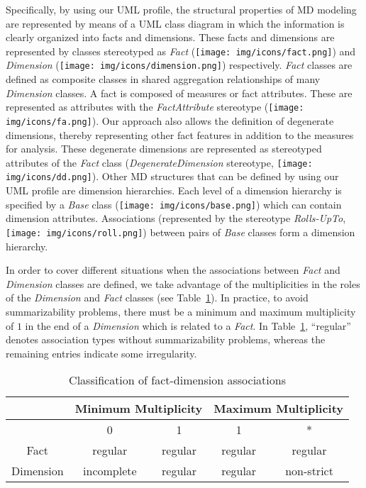 Specifically, by using our UML profile, the structural properties of
MD modeling are represented by means of a UML class diagram in which
the information is clearly organized into facts and dimensions.
These facts and dimensions are represented by classes stereotyped as
\emph{Fact} (\texttt{[image: img/icons/fact.png]}) and
\emph{Dimension}
(\texttt{[image: img/icons/dimension.png]})
respectively. \emph{Fact} classes are defined as composite classes
in shared aggregation relationships of many \emph{Dimension}
classes. A fact is composed of measures or fact attributes. These
are represented as attributes with the \emph{FactAttribute}
stereotype (\texttt{[image: img/icons/fa.png]}). Our
approach also allows the definition of degenerate dimensions,
thereby representing other fact features in addition to the measures
for analysis. These degenerate dimensions are represented as
stereotyped attributes of the \emph{Fact} class
(\emph{DegenerateDimension} stereotype,
\texttt{[image: img/icons/dd.png]}).
Other MD structures that can be defined by using our UML profile are
dimension hierarchies. Each level of a dimension hierarchy is
specified by a \textit{Base} class
(\texttt{[image: img/icons/base.png]}) which can contain
dimension attributes. Associations (represented by the stereotype
\textit{Rolls-UpTo},
\texttt{[image: img/icons/roll.png]}) between pairs of
\textit{Base} classes form a dimension hierarchy.

In order to cover different situations when the associations between
\emph{Fact} and \emph{Dimension} classes are defined, we take
advantage of the multiplicities in the roles of the \emph{Dimension}
and \emph{Fact} classes (see
Table~\ref{a3:tab:FD-multiplicity-classification}). In practice, to
avoid summarizability problems, there must be a minimum and maximum
multiplicity of $1$ in the end of a \emph{Dimension} which is
related to a \emph{Fact}. In
Table~\ref{a3:tab:FD-multiplicity-classification}, ``regular''
denotes association types without summarizability problems, whereas
the remaining entries indicate some irregularity.

\begin{table}
  \centering
  \caption{Classification of fact-dimension associations}
  \label{a3:tab:FD-multiplicity-classification}
    \begin{tabular}{|c||c|c|c|c|}
         \hline
       & \multicolumn{2}{|c|}{Minimum Multiplicity} & \multicolumn{2}{|c|}{Maximum Multiplicity} \\\hline
       & 0 & 1 & 1 & * \\\hline
      Fact & regular & regular & regular & regular \\
      Dimension & incomplete & regular & regular & non-strict \\\hline
    \end{tabular}
\end{table}

